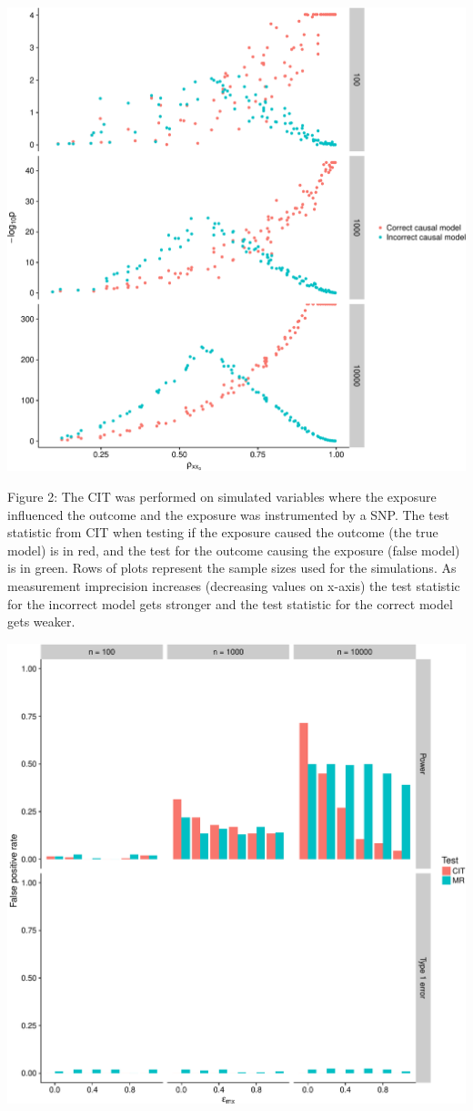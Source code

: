 \documentclass[]{article}
\begin{document}
\newpage

\includegraphics{manuscript_files/figure-latex/cit_measurement_error_figure-1.pdf}

Figure 2: The CIT was performed on simulated variables where the
exposure influenced the outcome and the exposure was instrumented by a
SNP. The test statistic from CIT when testing if the exposure caused the
outcome (the true model) is in red, and the test for the outcome causing
the exposure (false model) is in green. Rows of plots represent the
sample sizes used for the simulations. As measurement imprecision
increases (decreasing values on x-axis) the test statistic for the
incorrect model gets stronger and the test statistic for the correct
model gets weaker.

\newpage

\includegraphics{manuscript_files/figure-latex/causality_exists_tpr-1.pdf}
\end{document}
